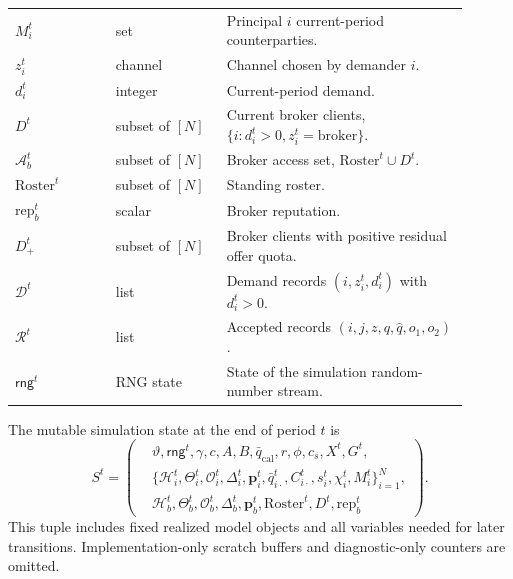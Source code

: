 \documentclass[11pt]{article}
\newcommand{\Ab}{\mathcal A_b}
\begin{document}
\begin{longtable}{>{\raggedright\arraybackslash}p{0.20\linewidth}
                >{\raggedright\arraybackslash}p{0.22\linewidth}
                >{\raggedright\arraybackslash}p{0.48\linewidth}}
$M_i^t$ & set & Principal $i$ current-period counterparties. \\
$z_i^t$ & channel & Channel chosen by demander $i$. \\
$d_i^t$ & integer & Current-period demand. \\
$D^t$ & subset of $[N]$ & Current broker clients, $\{i:d_i^t>0,z_i^t=\mathrm{broker}\}$. \\
$\Ab^t$ & subset of $[N]$ & Broker access set, $\mathrm{Roster}^t\cup D^t$. \\
$\mathrm{Roster}^t$ & subset of $[N]$ & Standing roster. \\
$\mathrm{rep}_b^t$ & scalar & Broker reputation. \\
$D_+^t$ & subset of $[N]$ & Broker clients with positive residual offer quota. \\
$\mathcal D^t$ & list & Demand records $(i,z_i^t,d_i^t)$ with $d_i^t>0$. \\
$\mathcal R^t$ & list & Accepted records $(i,j,z,q,\hat q,o_1,o_2)$. \\
$\mathsf{rng}^t$ & RNG state & State of the simulation random-number stream. \\
\bottomrule
\end{longtable}
\endgroup

The mutable simulation state at the end of period $t$ is
\[
S^t=\left(
\begin{aligned}
&\vartheta,\mathsf{rng}^t,\gamma,c,A,B,\bar q_{\mathrm{cal}},r,\phi,c_s,
X^t,G^t,\\
&\{ \mathcal H_i^t,\Theta_i^t,\mathcal O_i^t,\Delta_i^t,\mathbf p_i^t,
\bar q_{i\cdot}^t,C_{i\cdot}^t,s_i^t,\chi_i^t,M_i^t\}_{i=1}^N,\\
&\mathcal H_b^t,\Theta_b^t,\mathcal O_b^t,\Delta_b^t,\mathbf p_b^t,
\mathrm{Roster}^t,D^t,\mathrm{rep}_b^t
\end{aligned}
\right).
\]
This tuple includes fixed realized model objects and all variables needed for later transitions. Implementation-only scratch buffers and diagnostic-only counters are omitted.
\end{document}
